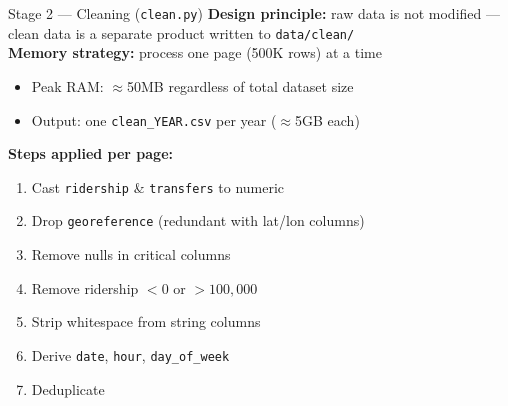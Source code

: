 \documentclass{beamer}
\begin{document}
	\begin{frame}[fragile]{Stage 2 — Cleaning (\texttt{clean.py})}
		\textbf{Design principle:} raw data is not modified — clean data
		is a separate product written to \texttt{data/clean/}\\
		\vspace{0.3cm}
		\textcolor{accentBlue}{\textbf{Memory strategy:}} process one page (500K rows) at a time
		\begin{itemize}
			\item Peak RAM: $\approx$50MB regardless of total dataset size
			\item Output: one \texttt{clean\_YEAR.csv} per year ($\approx$5GB each)
		\end{itemize}
		\vspace{0.3cm}
		\textcolor{accentBlue}{\textbf{Steps applied per page:}}
		\begin{enumerate}
			\item Cast \texttt{ridership} \& \texttt{transfers} to numeric
			\item Drop \texttt{georeference} (redundant with lat/lon columns)
			\item Remove nulls in critical columns
			\item Remove ridership $< 0$ or $> 100{,}000$
			\item Strip whitespace from string columns
			\item Derive \texttt{date}, \texttt{hour}, \texttt{day\_of\_week}
			\item Deduplicate
		\end{enumerate}
	\end{frame}
	
\end{document}
